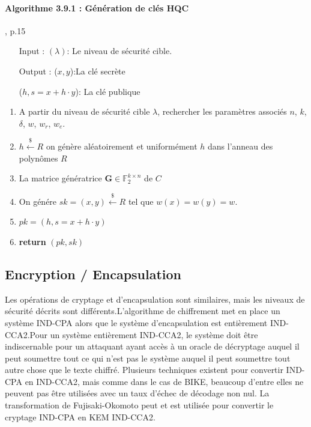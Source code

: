 \documentclass[12pt,openany]{report}
\begin{document}
\paragraph{Algorithme 3.9.1 : Génération de clés HQC \\}\cite{melchor2020}, p.15

\begin{itemize}
\item[Input :] $ (\lambda) $: Le niveau de sécurité cible.
\item[Output :]($x,y$):La clé secrète
\item[] ($h,s=x+h\cdot y$): La clé publique
\end{itemize}
\begin{enumerate}
\item A partir du niveau de sécurité cible $\lambda$, rechercher les paramètres associés $n$, $k$, $\delta$, $w$, $w_r$, $w_e$.
\item $ h \overset{\$}{\gets}\mathit{R}$ \Comment on génère aléatoirement et uniformément $h$ dans l'anneau des polynômes $\mathit{R}  $
\item La matrice génératrice $ \mathbf{G}\in \mathbb{F}_2^{k\times n} $ de $\mathit{C}$
\item On génére $sk=(x,y)\overset{\$}{\gets} \mathit{R}$ tel que $ w(x)=w(y)=w$.
\item $ pk=(h,s=x+h\cdot y)$
\item \textbf{return} $(pk,sk)$
 
\end{enumerate}

\subsection{Encryption / Encapsulation}

Les opérations de cryptage et d'encapsulation sont similaires, mais les niveaux de sécurité décrits sont différents.L'algorithme de chiffrement met en place un système IND-CPA alors que le système d'encapsulation est entièrement IND-CCA2.Pour un système entièrement IND-CCA2, le système doit être indiscernable pour un attaquant ayant accès à un oracle de décryptage auquel il peut soumettre tout ce qui n'est pas le système auquel il peut soumettre tout autre chose que le texte chiffré. Plusieurs techniques existent pour convertir IND-CPA en IND-CCA2, mais comme dans le cas de BIKE, beaucoup d'entre elles ne peuvent pas être utilisées avec un taux d'échec de décodage non nul. La transformation de Fujisaki-Okomoto peut et est utilisée pour convertir le cryptage IND-CPA en KEM IND-CCA2.
\end{document}
